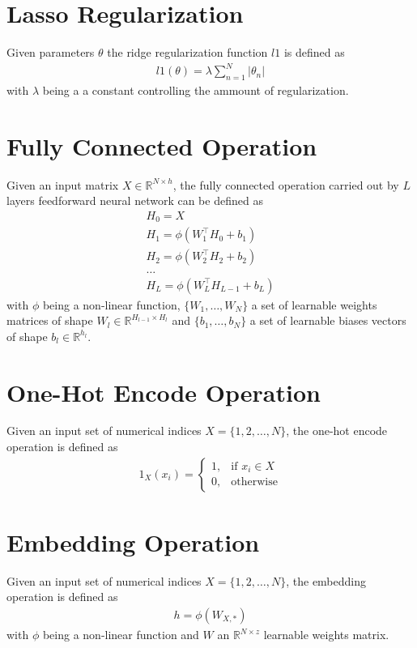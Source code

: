 \section{Lasso Regularization}
Given parameters $\theta$ the ridge regularization function $l1$ is defined as 
\begin{gather}
    \label{lasso}
    l1(\theta) = \lambda \sum_{n=1}^{N}|\theta_n|
\end{gather}
with $\lambda$ being a a constant controlling the ammount of regularization.

\section{Fully Connected Operation}
Given an input matrix $X \in \mathbb{R}^{N \times h}$, the fully connected operation carried out by $L$ layers feedforward neural network can be defined as
\begin{gather}
    \label{fnn_operation}
    H_0 = X \\ \nonumber
    H_1 = \phi(W_1^\top H_0 + b_1)\\ \nonumber
   H_2 = \phi(W_2^\top H_2  + b_2)\\ \nonumber
    \dots\\ \nonumber
   H_L = \phi(W_L^\top H_{L-1}  + b_L) \nonumber
\end{gather}
with $\phi$ being a non-linear function, $\{W_1, \dots, W_N\}$ a set of learnable weights matrices of shape $W_l \in \mathbb{R}^{H_{l-1} \times H_{l}}$ and $\{b_1, \dots, b_N\}$ a set of learnable biases vectors of shape $b_l \in \mathbb{R}^{h_l}$.

\section{One-Hot Encode Operation}
Given an input set of numerical indices $X = \{1, 2, \dots, N\}$, the one-hot encode operation is defined as 
\begin{gather}
    \label{one_hot_encode_operation}
    1_X(x_i) = 
    \begin{cases}
        1,& \text{if } x_i \in X \\
        0,              & \text{otherwise}
    \end{cases}
\end{gather}

\section{Embedding Operation}
Given an input set of numerical indices $X = \{1, 2, \dots, N\}$, the embedding operation is defined as 
\begin{gather}
    \label{embedding_operation}
    h = \phi(W_{X,*})
\end{gather}
with $\phi$ being a non-linear function and $W$ an $\mathbb{R}^{N \times z}$ learnable weights matrix.

